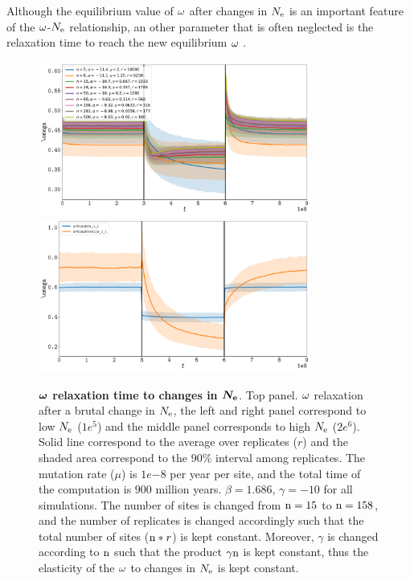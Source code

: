 \documentclass{article}
\begin{document}
Although the equilibrium value of $\omega$ after changes in $N_{\mathrm{e}}$ is an important feature of the $\omega$-$N_{\mathrm{e}}$ relationship, an other parameter that is often neglected is the relaxation time to reach the new equilibrium $\omega$ \cite{Jones2016}.
\begin{figure}[htb!]
\begin{mdframed}
	\centering
	\includegraphics[width=0.8\textwidth] {artworks/Relaxation-Stability-Alpha-Gamma.pdf}
	\includegraphics[width=0.8\textwidth] {artworks/Relaxation-DFE-Profile-N50.pdf}
	\caption{
		\textbf{$\bm{\omega}$ relaxation time to changes in $\bm{N_{\mathrm{e}}}$}.
		Top panel. $\omega$ relaxation after a brutal change in $N_{\mathrm{e}}$, the left and right panel correspond to low $N_{\mathrm{e}}$ ($1e^{5}$) and the middle panel corresponds to high $N_{\mathrm{e}}$ ($2e^{6}$). 
		Solid line correspond to the average over replicates ($r$) and the shaded area correspond to the $90\%$ interval among replicates. 
		The mutation rate ($\mu$) is $1e{-8}$ per year per site, and the total time of the computation is $900$ million years.
		$\beta=1.686$, $\gamma=-10$ for all simulations. The number of sites is changed from $\text{n}=15$ to $\text{n}=158$, and the number of replicates is changed accordingly such that the total number of sites ($\text{n}*r$) is kept constant.
		Moreover, $\gamma$ is changed according to $\text{n}$ such that the product $\gamma\text{n}$ is kept constant, thus the  elasticity of the $\omega$ to changes in $N_{\mathrm{e}}$ is kept constant.
}
\end{mdframed}
\end{figure}
\end{document}
